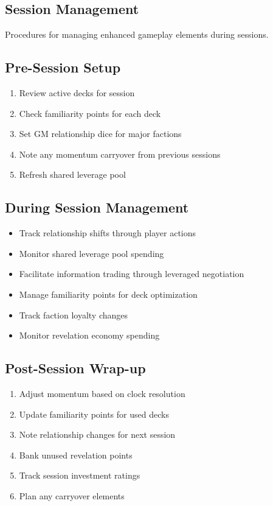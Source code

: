 \begin{description}
\begin{description}
\section{Session Management}

Procedures for managing enhanced gameplay elements during sessions.

\subsection{Pre-Session Setup}

\begin{enumerate}
\item Review active decks for session
\item Check familiarity points for each deck
\item Set GM relationship dice for major factions
\item Note any momentum carryover from previous sessions
\item Refresh shared leverage pool
\end{enumerate}

\subsection{During Session Management}

\begin{itemize}
\item Track relationship shifts through player actions
\item Monitor shared leverage pool spending
\item Facilitate information trading through leveraged negotiation
\item Manage familiarity points for deck optimization
\item Track faction loyalty changes
\item Monitor revelation economy spending
\end{itemize}

\subsection{Post-Session Wrap-up}

\begin{enumerate}
\item Adjust momentum based on clock resolution
\item Update familiarity points for used decks
\item Note relationship changes for next session
\item Bank unused revelation points
\item Track session investment ratings
\item Plan any carryover elements
\end{enumerate}


\end{description}
\end{description}
